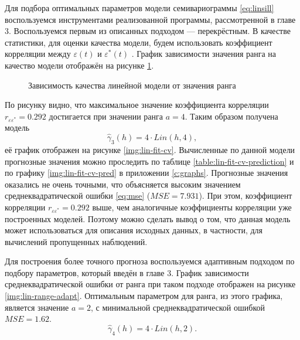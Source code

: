 Для подбора оптимальных параметров модели семивариограммы \eqref{eq:linsill} воспользуемся инструментами реализованной программы, рассмотренной в главе 3. Воспользуемся первым из описанных подходом --- перекрёстным. В качестве статистики, для оценки качества модели, будем использовать коэффициент корреляции между $ \varepsilon(t) $ и $ \varepsilon^{*}(t)$ . График зависимости значения ранга на качество модели отображён на рисунке \ref{img:lin-range-cv}.
\begin{figure}[ht]
\caption{Зависимость качества линейной модели от значения ранга}
\label{img:lin-range-cv}
\end{figure}
По рисунку видно, что максимальное значение коэффициента корреляции $ r_{\varepsilon\varepsilon^{*}} = 0.292 $ достигается при значении ранга $ a = 4 $. Таким образом получена модель
\begin{equation}
\label{eq:gamma3}
 	\widehat{\gamma}_3(h) = 4 \cdot Lin(h, 4),
\end{equation}
её график отображен на рисунке \ref{img:lin-fit-cv}. Вычисленные по данной модели прогнозные значения можно проследить по таблице \ref{table:lin-fit-cv-prediction} и по графику \ref{img:lin-fit-cv-pred} в приложении \ref{c:graphs}. Прогнозные значения оказались не очень точными, что объясняется высоким значением среднеквадратической ошибки \eqref{eq:mse} ($ MSE = 7.931 $). При этом, коэффициент корреляции $ r_{\varepsilon\varepsilon^{*}} = 0.292 $ выше, чем аналогичные коэффициенты корреляции уже построенных моделей. Поэтому можно сделать вывод о том, что данная модель может использоваться для описания исходных данных, в частности, для вычислений пропущенных наблюдений.



Для построения более точного прогноза воспользуемся адаптивным подходом по подбору параметров, который введён в главе 3. График зависимости среднеквадратической ошибки от ранга при таком подходе отображен на рисунке \ref{img:lin-range-adapt}. Оптимальным параметром для ранга, из этого графика, является значение $ a = 2 $, с минимальной среднеквадратической ошибкой $ MSE = 1.62 $.
\begin{equation}
\label{eq:gamma4}
 	\widehat{\gamma}_4(h) = 4 \cdot Lin(h, 2).
\end{equation}

